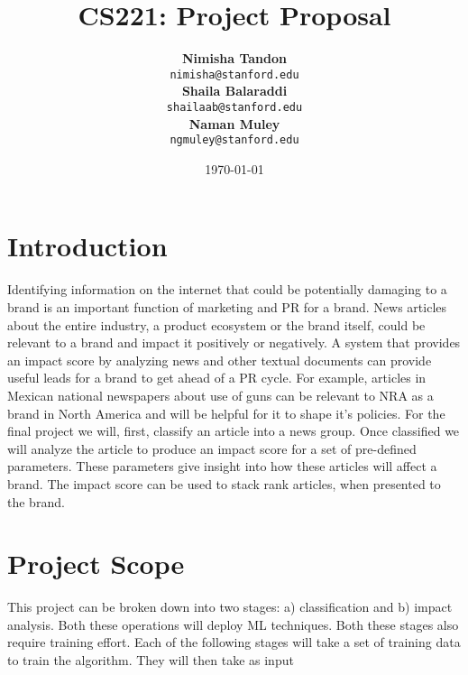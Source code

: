 \documentclass{article}
\title{CS221: Project Proposal} %
\author{	\textbf{Nimisha Tandon}\\  \texttt{nimisha@stanford.edu} \\
		\textbf{Shaila Balaraddi}\\  \texttt{shailaab@stanford.edu} \\ 
		\textbf{Naman Muley}\\      \texttt{ngmuley@stanford.edu}}
\date{\today} %
\begin{document}
\maketitle %


\section*{Introduction} %

Identifying information on the internet that could be potentially damaging to a brand is an important function of marketing and PR for a brand. News articles about the entire industry, a product ecosystem or the brand itself, could be relevant to a brand and impact it positively or negatively. A system that provides an impact score by analyzing news and other textual documents can provide useful leads for a brand to get ahead of a PR cycle. For example, articles in Mexican national newspapers about use of guns can be relevant to NRA as a brand in North America and will be helpful for it to shape it's policies.
\newline \newline
For the final project we will, first, classify an article into a news group. Once classified we will analyze the article to produce an impact score for a set of pre-defined parameters. These parameters give insight into how these articles will affect a brand. The impact score can be used to stack rank articles, when presented to the brand. 

\maketitle %

\section*{Project Scope} %

This project can be broken down into two stages: a) classification and b) impact analysis. Both these operations will deploy ML techniques. Both these stages also require training effort. Each of the following stages will take a set of training data to train the algorithm. They will then take as input 
\end{document}
